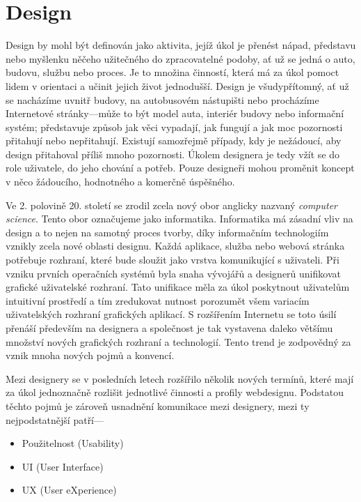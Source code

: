 \chapter{Design}
\label{chap:design}

Design by mohl být definován jako aktivita, jejíž úkol je přenést nápad, představu nebo myšlenku něčeho užitečného do zpracovatelné podoby, ať už se jedná o auto, budovu, službu nebo proces. Je to množina činností, která má za úkol pomoct lidem v orientaci a učinit jejich život jednodušší. Design je všudypřítomný, ať už se nacházíme uvnitř budovy, na autobusovém nástupišti nebo procházíme Internetové stránky---může to být model auta, interiér budovy nebo informační systém; představuje způsob jak věci vypadají, jak fungují a jak moc pozornosti přitahují nebo nepřitahují. Existují samozřejmě případy, kdy je nežádoucí, aby design přitahoval příliš mnoho pozornosti. Úkolem designera je tedy vžít se do role uživatele, do jeho chování a potřeb. Pouze designeři mohou proměnit koncept v něco žádoucího, hodnotného a komerčně úspěšného.

Ve 2. polovině 20. století se zrodil zcela nový obor anglicky nazvaný \textit{computer science}. Tento obor označujeme jako informatika. Informatika má zásadní vliv na design a to nejen na samotný proces tvorby, díky informačním technologiím vznikly zcela nové oblasti designu. Každá aplikace, služba nebo webová stránka potřebuje rozhraní, které bude sloužit jako vrstva komunikující s uživateli. Při vzniku prvních operačních systémů byla snaha vývojářů a designerů unifikovat grafické uživatelské rozhraní. Tato unifikace měla za úkol poskytnout uživatelům intuitivní prostředí a tím zredukovat nutnost porozumět všem variacím uživatelských rozhraní grafických aplikací. S rozšířením Internetu se toto úsilí přenáší především na designera a společnost je tak vystavena daleko většímu množství nových grafických rozhraní a technologií. Tento trend je zodpovědný za vznik mnoha nových pojmů a konvencí.

Mezi designery se v posledních letech rozšířilo několik nových termínů, které mají za úkol jednoznačně rozlišit jednotlivé činnosti a profily webdesignu. Podstatou těchto pojmů je zároveň usnadnění komunikace mezi designery, mezi ty nejpodstatnější patří---

\begin{itemize}
    \item Použitelnost (Usability)
    \item UI (User Interface)
    \item UX (User eXperience)
\end{itemize}

